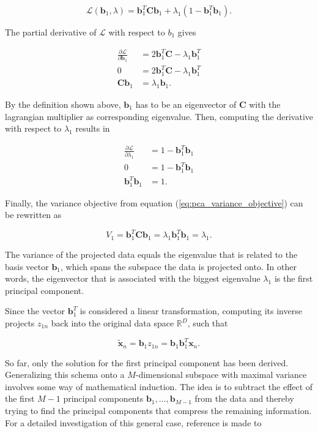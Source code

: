 \documentclass[../../../main.tex]{subfiles}
\begin{document}
\begin{equation*}
    \mathcal{L}(\bm{b}_1, \lambda) = \bm{b}_1^T \bm{C} \bm{b}_1 + \lambda_1(1-\bm{b}_1^T\bm{b}_1).
\end{equation*}

The partial derivative of $\mathcal{L}$ with respect to $b_1$ gives

\begin{align*}
    \frac{\partial{\mathcal{L}}}{\partial{\bm{b}_1}} &= 2\bm{b}_1^T \bm{C} - \lambda_1 \bm{b}_1^T \\
    0 &= 2\bm{b}_1^T \bm{C} - \lambda_1 \bm{b}_1^T \\
    \bm{C} \bm{b}_1 &= \lambda_1 \bm{b}_1.
\end{align*}

By the definition shown above, $\bm{b}_1$ has to be an eigenvector of $\bm{C}$ with the lagrangian multiplier as corresponding eigenvalue. Then, computing the derivative with respect to $\lambda_1$ results in

\begin{align*}
    \frac{\partial{\mathcal{L}}}{\partial{\lambda_1}} &= 1 - \bm{b}_1^T\bm{b}_1 \\
    0 &= 1 - \bm{b}_1^T\bm{b}_1 \\
    \bm{b}_1^T\bm{b}_1 &= 1.
\end{align*}

Finally, the variance objective from equation (\ref{eq:pca_variance_objective}) can be rewritten as 

\begin{equation}
    V_1 = \bm{b}_1^T \bm{C} \bm{b}_1 = \lambda_1 \bm{b}_1^T \bm{b}_1 = \lambda_1. 
\end{equation}

The variance of the projected data equals the eigenvalue that is related to the basis vector $\bm{b}_1$, which spans the subspace the data is projected onto. In other words, the eigenvector that is associated with the biggest eigenvalue $\lambda_1$ is the first principal component.

Since the vector $\bm{b}_1^T$ is considered a linear transformation, computing its inverse projects $z_{1n}$ back into the original data space $\mathbb{R}^D$, such that

\begin{equation*}
    \tilde{\bm{x}}_n = \bm{b}_1z_{1n} = \bm{b}_1 \bm{b}_1^T \bm{x}_n.
\end{equation*}

So far, only the solution for the first principal component has been derived. Generalizing this schema onto a $M$-dimensional subspace with maximal variance involves some way of mathematical induction. The idea is to subtract the effect of the first $M-1$ principal components $\bm{b}_1, \dots, \bm{b}_{M-1}$ from the data and thereby trying to find the principal components that compress the remaining information. For a detailed investigation of this general case, reference is made to \cite[pp.291]{dei_2020}
\end{document}
